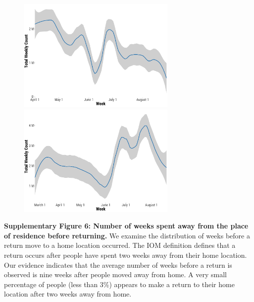 \documentclass[
  11pt,
]{article}
\begin{document}
\begin{figure}[h]

\begin{minipage}{0.50\linewidth}

\includegraphics[width=3.02083in,height=\textheight]{../outputs/sm/ukr_wide_returns_iom.png}

\end{minipage}%
%
\begin{minipage}{0.50\linewidth}

\includegraphics[width=3.02083in,height=\textheight]{../outputs/sm/ukr_wide_returns2_doug.png}

\end{minipage}%

\end{figure}%

\newpage

\textbf{Supplementary Figure 6: Number of weeks spent away from the
place of residence before returning.} We examine the distribution of
weeks before a return move to a home location occurred. The IOM
definition defines that a return occurs after people have spent two
weeks away from their home location. Our evidence indicates that the
average number of weeks before a return is observed is nine weeks after
people moved away from home. A very small percentage of people (less
than 3\%) appears to make a return to their home location after two
weeks away from home.
\end{document}

